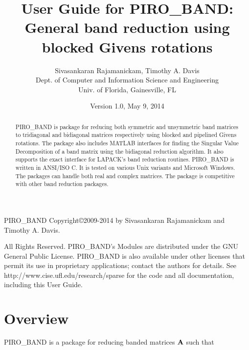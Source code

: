 \documentclass[11pt]{article}
\newcommand{\m}[1]{{\bf{#1}}}       %
\begin{document}
\author{Sivasankaran Rajamanickam, Timothy A. Davis \\
Dept. of Computer and Information Science and Engineering \\
Univ. of Florida, Gainesville, FL}
\title{User Guide for PIRO\_BAND: General band reduction using 
blocked Givens rotations}
\date{Version 1.0, May 9, 2014}
\maketitle

\begin{abstract}
    PIRO\_BAND is package for reducing both symmetric and unsymmetric band
    matrices to tridiagonal and bidiagonal matrices respectively using blocked 
    and pipelined Givens rotations. The package also includes MATLAB interfaces
    for finding the Singular Value Decomposition of a band matrix using the
    bidiagonal reduction algorithm. It also supports the exact interface
    for LAPACK's band reduction routines. PIRO\_BAND is written in ANSI/ISO C.
    It is tested on various Unix variants and Microsoft Windows. The packages
    can handle both real and complex matrices. The package is competitive with
    other band reduction packages.
\end{abstract}

PIRO\_BAND Copyright\copyright 2009-2014 by Sivasankaran Rajamanickam and 
Timothy A. Davis.  

All Rights Reserved.  PIRO\_BAND's Modules are distributed under the GNU
General Public License.
PIRO\_BAND is also available under other licenses that permit its use in
proprietary applications; contact the authors for details.
See http://www.cise.ufl.edu/research/sparse for the code and all documentation,
including this User Guide.

\newpage
\tableofcontents

\newpage \section{Overview}

PIRO\_BAND is a package for reducing banded matrices $\m{A}$ such that 
\end{document}
